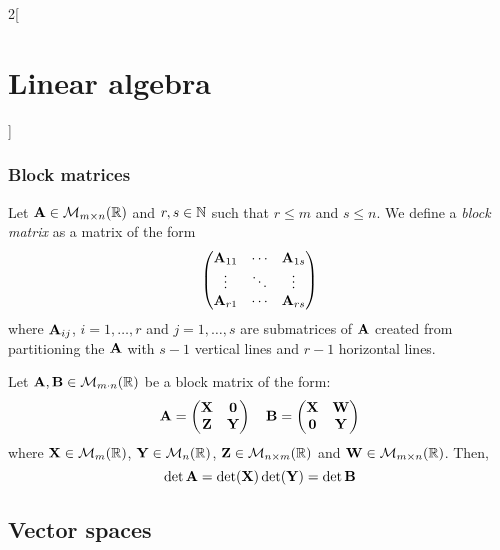 \documentclass[../../../main_math.tex]{subfiles}
\begin{document}
\begin{multicols}{2}[\section{Linear algebra}]
  \subsubsection{Block matrices}
  \begin{definition}
    Let $\boldsymbol{\mathrm{A}}\in\mathcal{M}_{m\times n}(\mathbb{R})$ and $r,s\in\mathbb{N}$ such that $r\leq m$ and $s\leq n$. We define a \emph{block matrix} as a matrix of the form
    $$
      \begin{pmatrix}
        \boldsymbol{\mathrm{A}}_{11} & \cdots & \boldsymbol{\mathrm{A}}_{1s} \\
        \vdots      & \ddots & \vdots      \\
        \boldsymbol{\mathrm{A}}_{r1} & \cdots & \boldsymbol{\mathrm{A}}_{rs}
      \end{pmatrix}
    $$
    where $\boldsymbol{\mathrm{A}}_{ij}$, $i=1,\ldots,r$ and $j=1,\ldots,s$ are submatrices of $\boldsymbol{\mathrm{A}}$ created from partitioning the $\boldsymbol{\mathrm{A}}$ with $s-1$ vertical lines and $r-1$ horizontal lines.
  \end{definition}
  \begin{proposition}
    Let $\boldsymbol{\mathrm{A}},\boldsymbol{\mathrm{B}}\in\mathcal{M}_{m\cdot n}(\mathbb{R})$ be a block matrix of the form:
    $$\boldsymbol{\mathrm{A}}=
      \begin{pmatrix}
        \boldsymbol{\mathrm{X}} & \boldsymbol{\mathrm{0}} \\
        \boldsymbol{\mathrm{Z}} & \boldsymbol{\mathrm{Y}}
      \end{pmatrix}\quad
      \boldsymbol{\mathrm{B}}=
      \begin{pmatrix}
        \boldsymbol{\mathrm{X}} & \boldsymbol{\mathrm{W}} \\
        \boldsymbol{\mathrm{0}} & \boldsymbol{\mathrm{Y}}
      \end{pmatrix}
    $$
    where $\boldsymbol{\mathrm{X}}\in\mathcal{M}_m(\mathbb{R})$, $\boldsymbol{\mathrm{Y}}\in\mathcal{M}_n(\mathbb{R})$, $\boldsymbol{\mathrm{Z}}\in\mathcal{M}_{n\times m}(\mathbb{R})$ and $\boldsymbol{\mathrm{W}}\in\mathcal{M}_{m\times n}(\mathbb{R})$. Then, $$\det\boldsymbol{\mathrm{A}}=\det(\boldsymbol{\mathrm{X}})\det(\boldsymbol{\mathrm{Y}})=\det\boldsymbol{\mathrm{B}}$$
  \end{proposition}
  \subsection{Vector spaces}

\end{multicols}
\end{document}
